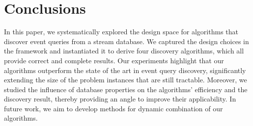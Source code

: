 \section{Conclusions}
\label{sec:conclusions}
In this paper, we systematically explored the design space
for algorithms that discover event queries from a stream database. We
captured the design choices in the \sys{} framework and instantiated it to
derive four discovery algorithms, which all
provide correct and complete results. Our experiments highlight
that our algorithms outperform the state of the art in event query
discovery, significantly extending the size of the problem instances that
are still tractable. Moreover, we studied the influence of database
properties on the algorithms' efficiency and the discovery result, thereby
providing an angle to improve their applicability. In future work, we aim to
develop methods for dynamic combination of our algorithms.